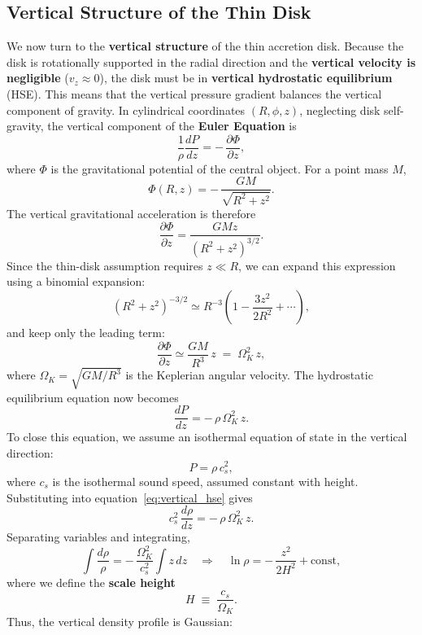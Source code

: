 \subsection{Vertical Structure of the Thin Disk}

We now turn to the \textbf{vertical structure} of the thin accretion disk.  Because the disk is rotationally supported in the radial direction and the \textbf{vertical velocity is negligible} ($v_z \approx 0$),  the disk must be in \textbf{vertical hydrostatic equilibrium} (HSE). This means that the vertical pressure gradient balances the vertical component of gravity. In cylindrical coordinates $(R, \phi, z)$, neglecting disk self-gravity, the vertical component of the \textbf{Euler Equation} is
\begin{equation}
\frac{1}{\rho}\frac{dP}{dz} = -\,\frac{\partial \Phi}{\partial z},
\end{equation}
where $\Phi$ is the gravitational potential of the central object.  
For a point mass $M$,
\[
\Phi(R,z) = -\,\frac{GM}{\sqrt{R^2 + z^2}}.
\]
The vertical gravitational acceleration is therefore
\[
\frac{\partial \Phi}{\partial z} = \frac{GMz}{(R^2 + z^2)^{3/2}}.
\]
Since the thin-disk assumption requires $z \ll R$, we can expand this expression using a binomial expansion:
\[
(R^2 + z^2)^{-3/2} \simeq R^{-3}\left(1 - \frac{3z^2}{2R^2} + \cdots\right),
\]
and keep only the leading term:
\begin{equation}
\frac{\partial \Phi}{\partial z} \simeq \frac{GM}{R^3}\,z \;=\; \Omega_K^2\,z,
\end{equation}
where $\Omega_K = \sqrt{GM/R^3}$ is the Keplerian angular velocity. The hydrostatic equilibrium equation now becomes
\begin{equation}
\frac{dP}{dz} = -\,\rho\,\Omega_K^2\,z.
\label{eq:vertical_hse}
\end{equation}
To close this equation, we assume an isothermal equation of state in the vertical direction:
\[
P = \rho\,c_s^2,
\]
where $c_s$ is the isothermal sound speed, assumed constant with height. Substituting into equation~\eqref{eq:vertical_hse} gives
\[
c_s^2\,\frac{d\rho}{dz} = -\,\rho\,\Omega_K^2\,z.
\]
Separating variables and integrating,
\[
\int \frac{d\rho}{\rho} = -\,\frac{\Omega_K^2}{c_s^2}\int z\,dz
\quad\Rightarrow\quad
\ln\rho = -\,\frac{z^2}{2H^2} + \text{const},
\]
where we define the \textbf{scale height}
\begin{equation}
\boxed{
H \;\equiv\; \frac{c_s}{\Omega_K}.
}
\end{equation}
Thus, the vertical density profile is Gaussian:

